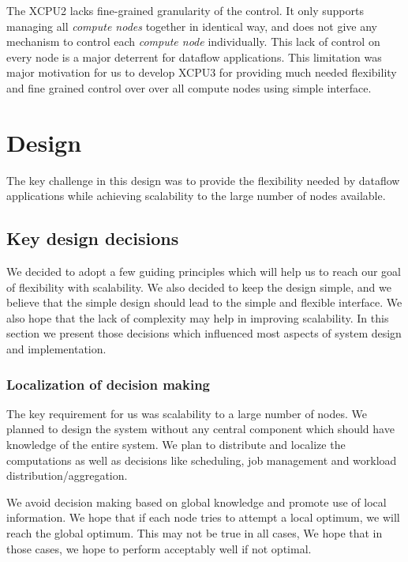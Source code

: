 \documentclass[conference]{IEEEtran}
\begin{document}
The XCPU2 lacks fine-grained granularity of the control.  It only supports
managing all \textit{compute nodes} together in identical way, and does not
give any mechanism to control each \textit{compute node} individually.  This
lack of control on every node is a major deterrent for dataflow applications.
This limitation was major motivation for us to develop XCPU3 for providing much
needed flexibility and fine grained control over over all compute nodes using
simple interface.



\section{Design}

The key challenge in this design was to provide the flexibility needed by
dataflow applications while achieving scalability to the large number of nodes
available. 

\subsection{Key design decisions}

We decided to adopt a few guiding principles which will help us to reach our
goal of flexibility with scalability.  We also decided to keep the design simple,
and we believe that the simple design should lead to the simple and flexible
interface. We also hope that the lack of complexity may help in improving
scalability. In this section we present those decisions which influenced most
aspects of system design and implementation.

\subsubsection{Localization of decision making}
The key requirement for us was scalability to a large number of nodes.  We
planned to design the system without any central component which should have
knowledge of the entire system.  We plan to distribute and localize the
computations as well as decisions like scheduling, job management and
workload distribution/aggregation.

We avoid decision making based on global knowledge and promote use of local
information.  We hope that if each node tries to attempt a local optimum, we
will reach the global optimum.  This may not be true in all cases, We hope
that in those cases, we hope to perform acceptably well if not optimal.
\end{document}
